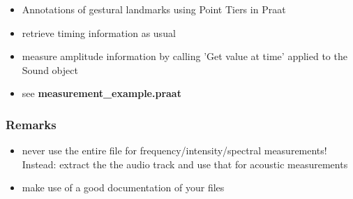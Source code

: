 \documentclass[12pt,a4paper]{beamer}
\begin{document}
\begin{frame}
    \begin{itemize}
        \item Annotations of gestural landmarks using Point Tiers in Praat
        \item retrieve timing information as usual
        \item measure amplitude information by calling 'Get value at time' applied to the Sound object
        \item see \textbf{measurement\_example.praat}
    \end{itemize}
\end{frame}

\begin{frame}
    \frametitle{Remarks}
    \begin{itemize}
        \item never use the entire file for frequency/intensity/spectral measurements! Instead: extract the the audio track and use that for acoustic measurements
        \item make use of a good documentation of your files
    \end{itemize}
\end{frame}
\end{document}

